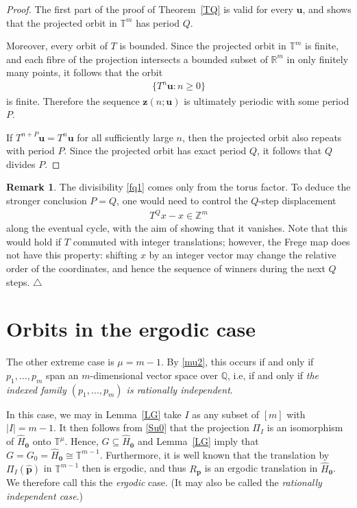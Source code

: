 \documentclass[11pt,reqno,tbtags,a4paper]{amsart}
\numberwithin{equation}{section}
\renewcommand\ge{\geq}
\renewcommand\geq{\geqslant}
\theoremstyle{plain}%
\theoremstyle{definition}
\newcommand\xqed[1]{%
    \leavevmode\unskip\penalty9999 \hbox{}\nobreak\hfill
    \quad\hbox{#1}}
\newtheorem{remarkqqq}[theorem]{Remark}
\newenvironment{remark}{\begin{remarkqqq}}
  {\xqed{$\triangle$}\end{remarkqqq}}
\theoremstyle{remark}
\newcounter{steps}
\newcommand{\refT}[1]{Theorem~\ref{#1}}
\newcommand{\refL}[1]{Lemma~\ref{#1}}
\newcommand\punkt{\xperiod}    %
\newcommand\ie{i.e\punkt}
\newcommand\bbR{\mathbb R}
\newcommand\bbT{\mathbb T}
\newcommand\bbQ{\mathbb Q}
\newcommand\bbZ{\mathbb Z}
\newcounter{cc}
\newcommand\hHo{\hH_{\0}}
\newcommand\vp{\mathbf{p}}
\newcommand\hvp{\hat{\mathbf{p}}}
\newcommand\vu{\mathbf{u}}
\newcommand\vz{\mathbf{z}}
\newcommand\Rp{R_\vp}
\newcommand\hH{\widehat{H}}
\newcommand\0{{\boldsymbol 0}}
\newcommand\1{{\boldsymbol 1}}
\begin{document}
\begin{proof}
%
%
%
%
%
%
%
%
%
%
%
%
%
The first part of the proof of \refT{TQ} is valid for every $\vu$, and shows
that the projected orbit in $\bbT^m$ has period $Q$.

Moreover, every orbit of $T$ is bounded. Since the projected orbit in
$\bbT^m$ is finite, and each fibre of the projection intersects a bounded subset
of $\bbR^m$ in only finitely many points, it follows that the orbit
\begin{align}
\{T^n\vu:n\ge0\}
\end{align}
is finite. Therefore the sequence $\vz(n;\vu)$ is ultimately periodic with
some period $P$.

If $T^{n+P}\vu=T^n\vu$ for all sufficiently large $n$, then the projected
orbit also repeats with period $P$. Since the projected orbit has exact period
$Q$, it follows that $Q$ divides $P$.
\end{proof}

\begin{remark}
The divisibility \eqref{fq1} comes only from the torus factor. To deduce the
stronger conclusion $P=Q$, one would need to control
the $Q$-step displacement
\begin{align}
T^Qx-x\in\bbZ^m
\end{align}
along the eventual cycle, with the aim of showing that it vanishes. 
Note that this would hold if $T$
commuted with integer translations; however,  
the Frege map does not have this property:
shifting $x$ by an integer vector may change the relative order of the
coordinates, and hence the sequence of winners during the next $Q$ steps.
\end{remark}


\section{Orbits in the ergodic case}\label{Sergodic}

The other extreme case is $\mu=m-1$.
By \eqref{mu2}, this occurs if and only if $p_1,\dots,p_m$ span an
$m$-dimensional vector space over $\bbQ$, \ie, 
if and only if
\emph{the indexed family $(p_1,\dots,p_m)$ is rationally independent}.

In this case, we may in \refL{LG} take $I$ as any subset of $[m]$ with
$|I|=m-1$.
It then follows from \eqref{Su0} that
the projection $\Pi_I$ is 
an isomorphism of $\hH_\0$ onto $\bbT^\mu$. 
Hence, $G\subseteq\hHo$ and \refL{LG} imply that  $G=G_0=\hHo\cong\bbT^{m-1}$.
Furthermore, it is well known that the translation by $\Pi_I(\hvp)$ in
$\bbT^{m-1}$ then is ergodic, and thus $\Rp$ is an ergodic translation in
$\hH_\0$. We therefore call this the \emph{ergodic} case.
(It may also be called the \emph{rationally independent case}.)
\end{document}
